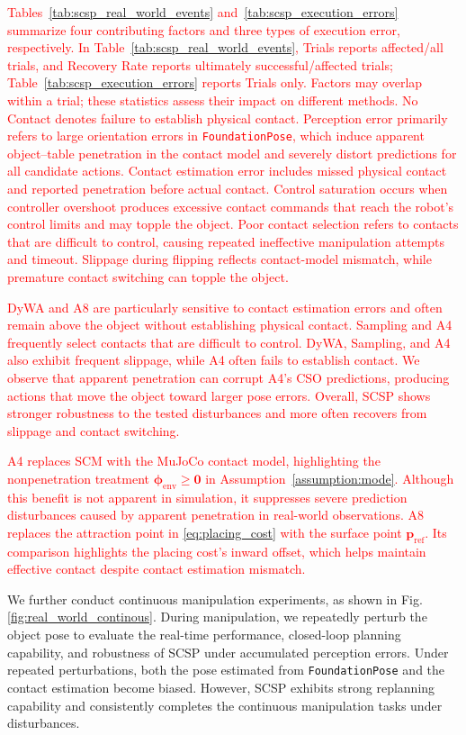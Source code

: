 \textcolor{red}{Tables~\ref{tab:scsp_real_world_events} and~\ref{tab:scsp_execution_errors} summarize four contributing factors and three types of execution error, respectively. In Table~\ref{tab:scsp_real_world_events}, Trials reports affected/all trials, and Recovery Rate reports ultimately successful/affected trials; Table~\ref{tab:scsp_execution_errors} reports Trials only. Factors may overlap within a trial; these statistics assess their impact on different methods. No Contact denotes failure to establish physical contact. Perception error primarily refers to large orientation errors in \texttt{FoundationPose}, which induce apparent object--table penetration in the contact model and severely distort predictions for all candidate actions. Contact estimation error includes missed physical contact and reported penetration before actual contact. Control saturation occurs when controller overshoot produces excessive contact commands that reach the robot's control limits and may topple the object. Poor contact selection refers to contacts that are difficult to control, causing repeated ineffective manipulation attempts and timeout. Slippage during flipping reflects contact-model mismatch, while premature contact switching can topple the object.}

\textcolor{red}{DyWA and A8 are particularly sensitive to contact estimation errors and often remain above the object without establishing physical contact. Sampling and A4 frequently select contacts that are difficult to control. DyWA, Sampling, and A4 also exhibit frequent slippage, while A4 often fails to establish contact. We observe that apparent penetration can corrupt A4's CSO predictions, producing actions that move the object toward larger pose errors. Overall, SCSP shows stronger robustness to the tested disturbances and more often recovers from slippage and contact switching.}

\textcolor{red}{A4 replaces SCM with the MuJoCo contact model, highlighting the nonpenetration treatment $\boldsymbol{\phi}_{\mathrm{env}}\geq\boldsymbol0$ in Assumption~\ref{assumption:mode}. Although this benefit is not apparent in simulation, it suppresses severe prediction disturbances caused by apparent penetration in real-world observations. A8 replaces the attraction point in \eqref{eq:placing_cost} with the surface point $\boldsymbol p_{\mathrm{ref}}$. Its comparison highlights the placing cost's inward offset, which helps maintain effective contact despite contact estimation mismatch.}

We further conduct continuous manipulation experiments, as shown in Fig. \ref{fig:real_world_continous}. During manipulation, we repeatedly perturb the object pose to evaluate the real-time performance, closed-loop planning capability, and robustness of SCSP under accumulated perception errors. Under repeated perturbations, both the pose estimated from \texttt{FoundationPose} and the contact estimation become biased. However, SCSP exhibits strong replanning capability and consistently completes the continuous manipulation tasks under disturbances.

